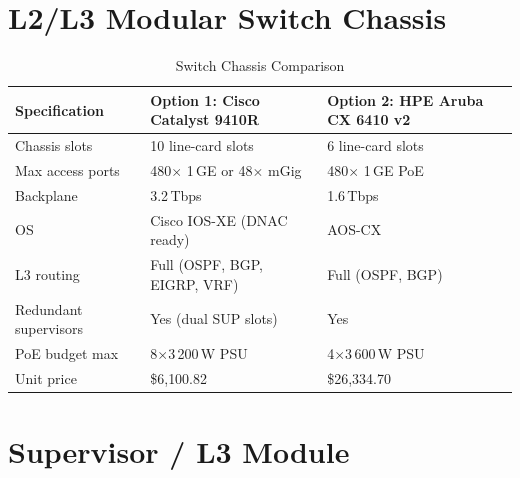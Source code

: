 \documentclass[12pt,a4paper]{report}
\begin{document}
\section{L2/L3 Modular Switch Chassis}

\begin{table}[H]
  \centering
  \caption{Switch Chassis Comparison}
  \label{tab:chassis_compare}
  \begin{tabular}{L{3.8cm} L{5.2cm} L{5.2cm}}
    \toprule
    \textbf{Specification} & \textbf{Option 1: Cisco Catalyst 9410R} & \textbf{Option 2: HPE Aruba CX 6410 v2} \\
    \midrule
    Chassis slots          & 10 line-card slots              & 6 line-card slots \\
    Max access ports       & 480$\times$ 1\,GE or 48$\times$ mGig & 480$\times$ 1\,GE PoE \\
    Backplane              & 3.2\,Tbps                       & 1.6\,Tbps \\
    OS                     & Cisco IOS-XE (DNAC ready)       & AOS-CX \\
    L3 routing             & Full (OSPF, BGP, EIGRP, VRF)    & Full (OSPF, BGP) \\
    Redundant supervisors  & Yes (dual SUP slots)            & Yes \\
    PoE budget max         & 8$\times$3\,200\,W PSU          & 4$\times$3\,600\,W PSU \\
    Unit price       & \$6{,}100.82                    & \$26{,}334.70 \\
    \bottomrule
  \end{tabular}
\end{table}

\section{Supervisor / L3 Module}
\end{document}
